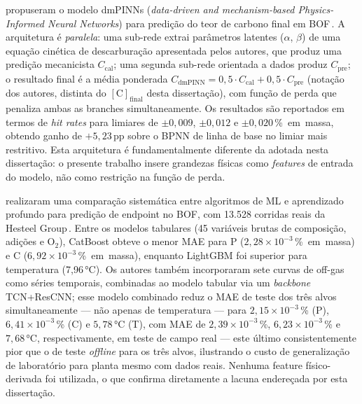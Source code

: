\citeauthor{xia2024dmpinn} propuseram o modelo dmPINNs (\textit{data-driven and mechanism-based Physics-Informed Neural Networks}) para predição do teor de carbono final em BOF\,\cite{xia2024dmpinn}. A arquitetura é \textit{paralela}: uma sub-rede extrai parâmetros latentes ($\alpha$, $\beta$) de uma equação cinética de descarburação apresentada pelos autores, que produz uma predição mecanicista $C_\text{cal}$; uma segunda sub-rede orientada a dados produz $C_\text{pre}$; o resultado final é a média ponderada $C_\text{dmPINN} = 0{,}5 \cdot C_\text{cal} + 0{,}5 \cdot C_\text{pre}$ (notação dos autores, distinta do $[\text{C}]_\text{final}$ desta dissertação), com função de perda que penaliza ambas as branches simultaneamente. Os resultados são reportados em termos de \textit{hit rates} para limiares de $\pm 0{,}009$, $\pm 0{,}012$ e $\pm 0{,}020$\,\%~em~massa, obtendo ganho de $+5{,}23$\,pp sobre o BPNN de linha de base no limiar mais restritivo. Esta arquitetura é fundamentalmente diferente da adotada nesta dissertação: o presente trabalho insere grandezas físicas como \textit{features} de entrada do modelo, não como restrição na função de perda.

\citeauthor{zhou2024bof} realizaram uma comparação sistemática entre algoritmos de ML e aprendizado profundo para predição de endpoint no BOF, com 13.528 corridas reais da Hesteel Group\,\cite{zhou2024bof}. Entre os modelos tabulares (45 variáveis brutas de composição, adições e O$_2$), CatBoost obteve o menor MAE para P ($2{,}28 \times 10^{-3}$\,\%~em~massa) e C ($6{,}92 \times 10^{-3}$\,\%~em~massa), enquanto LightGBM foi superior para temperatura (7{,}96\,°C). Os autores também incorporaram sete curvas de off-gas como séries temporais, combinadas ao modelo tabular via um \textit{backbone} TCN+ResCNN; esse modelo combinado reduz o MAE de teste dos três alvos simultaneamente --- não apenas de temperatura --- para $2{,}15 \times 10^{-3}$\,\% (P), $6{,}41 \times 10^{-3}$\,\% (C) e $5{,}78$\,°C (T), com MAE de $2{,}39 \times 10^{-3}$\,\%, $6{,}23 \times 10^{-3}$\,\% e $7{,}68$\,°C, respectivamente, em teste de campo real --- este último consistentemente pior que o de teste \textit{offline} para os três alvos, ilustrando o custo de generalização de laboratório para planta mesmo com dados reais. Nenhuma feature físico-derivada foi utilizada, o que confirma diretamente a lacuna endereçada por esta dissertação.

